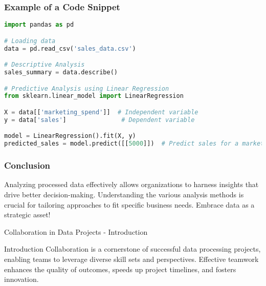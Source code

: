 \documentclass[aspectratio=169]{beamer}
\begin{document}
\begin{frame}[fragile]
    \frametitle{Example of a Code Snippet}
    \begin{lstlisting}[language=Python]
import pandas as pd

# Loading data
data = pd.read_csv('sales_data.csv')

# Descriptive Analysis
sales_summary = data.describe()

# Predictive Analysis using Linear Regression
from sklearn.linear_model import LinearRegression

X = data[['marketing_spend']]  # Independent variable
y = data['sales']               # Dependent variable

model = LinearRegression().fit(X, y)
predicted_sales = model.predict([[5000]])  # Predict sales for a marketing spend of $5000
    \end{lstlisting}
\end{frame}

\begin{frame}
    \frametitle{Conclusion}
    Analyzing processed data effectively allows organizations to harness insights that drive better decision-making. Understanding the various analysis methods is crucial for tailoring approaches to fit specific business needs. Embrace data as a strategic asset!
\end{frame}

\begin{frame}[fragile]{Collaboration in Data Projects - Introduction}
    \begin{block}{Introduction}
        Collaboration is a cornerstone of successful data processing projects, enabling teams to leverage diverse skill sets and perspectives. 
        Effective teamwork enhances the quality of outcomes, speeds up project timelines, and fosters innovation.
    \end{block}
\end{frame}
\end{document}
